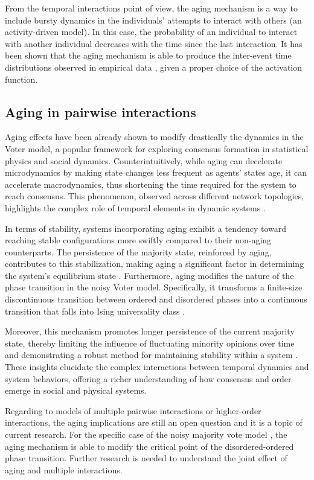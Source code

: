 From the temporal interactions point of view, the aging mechanism is a way to include bursty dynamics in the individuals' attempts to interact with others (an activity-driven model). In this case, the probability of an individual to interact with another individual decreases with the time since the last interaction. It has been shown that the aging mechanism is able to produce the inter-event time distributions observed in empirical data \cite{fernandez-gracia-2011}, given a proper choice of the activation function.

\subsection{\label{sec:Aging in pairwise interactions} Aging in pairwise interactions}

Aging effects have been already shown to modify drastically the dynamics in the Voter model, a popular framework for exploring consensus formation in statistical physics and social dynamics. Counterintuitively, while aging can decelerate microdynamics by making state changes less frequent as agents' states age, it can accelerate macrodynamics, thus shortening the time required for the system to reach consensus. This phenomenon, observed across different network topologies, highlights the complex role of temporal elements in dynamic systems \cite{Stark2008,fernandez-gracia-2011, perez-2016, perez-2016,boguna-2014}.

In terms of stability, systems incorporating aging exhibit a tendency toward reaching stable configurations more swiftly compared to their non-aging counterparts. The persistence of the majority state, reinforced by aging, contributes to this stabilization, making aging a significant factor in determining the system's equilibrium state \cite{peralta-2020}. Furthermore, aging modifies the nature of the phase transition in the noisy Voter model. Specifically, it transforms a finite-size discontinuous transition between ordered and disordered phases into a continuous transition that falls into Ising universality class \cite{artime-2018}.

Moreover, this mechanism promotes longer persistence of the current majority state, thereby limiting the influence of fluctuating minority opinions over time and demonstrating a robust method for maintaining stability within a system \cite{peralta-2020}. These insights elucidate the complex interactions between temporal dynamics and system behaviors, offering a richer understanding of how consensus and order emerge in social and physical systems.

Regarding to models of multiple pairwise interactions or higher-order interactions, the aging implications are still an open question and it is a topic of current research. For the specific case of the noisy majority vote model \cite{chen-2020}, the aging mechanism is able to modify the critical point of the disordered-ordered phase transition. Further research is needed to understand the joint effect of aging and multiple interactions.